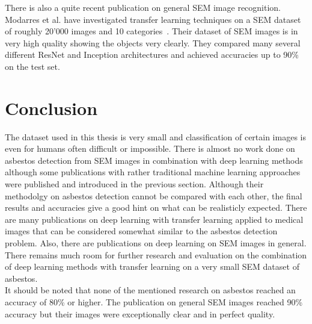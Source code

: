 There is also a quite recent publication on general SEM image recognition. Modarres et al. have investigated transfer learning techniques on a SEM dataset of roughly 20'000 images and 10 categories~\cite{modarres2017neural}. Their dataset of SEM images is in very high quality showing the objects very clearly. They compared many several different ResNet and Inception architectures and achieved accuracies up to 90\% on the test set. \\



\newpage

\section{Conclusion}

The dataset used in this thesis is very small and classification of certain images is even for humans often difficult or impossible. There is almost no work done on asbestos detection from SEM images in combination with deep learning methods although some publications with rather traditional machine learning approaches were published and introduced in the previous section. Although their methodolgy on asbestos detection cannot be compared with each other, the final results  and accuracies give a good hint on what can be realisticly expected. There are many publications on deep learning with transfer learning applied to medical images that can be considered somewhat similar to the asbestos detection problem. Also, there are publications on deep learning on SEM images in general. There remains much room for further research and evaluation on the combination of deep learning methods with transfer learning on a very small SEM dataset of asbestos.\\

It should be noted that none of the mentioned research on asbestos reached an accuracy of 80\% or higher. The publication on general SEM images reached 90\% accuracy but their images were exceptionally clear and in perfect quality.\\

















